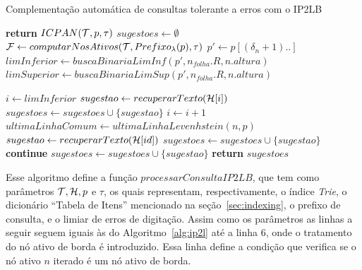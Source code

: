 \begin{algorithm}[H]
\caption{Complementação automática de consultas tolerante a erros com o IP2LB}\label{alg:ip2lb}
\begin{algorithmic}[1]
     \textbf{return} $ICPAN(\mathcal{T},p,\tau)$
    \EndIf
    \State $sugestoes \leftarrow \emptyset$
    \State $\mathcal{F} \leftarrow computarNosAtivos(\mathcal{T}, Prefixo_{\lambda}(p), \tau)$ 
         
         
                \State $p' \gets p[(\delta_{n} + 1)..]$
                \State $limInferior \gets buscaBinariaLimInf(p', n_{folha}.R, n.altura)$
                \State $limSuperior \gets buscaBinariaLimSup(p', n_{folha}.R, n.altura)$
                
                    \State $i \gets limInferior$
                        \State $sugestao \leftarrow recuperarTexto(\mathcal{H}[i])$
                        \State $sugestoes \gets sugestoes \cup \{ sugestao \} $
                        \State $i \gets i + 1$
                    \EndWhile
                \EndIf
            \EndFor
        \Else {}
            \State $ultimaLinhaComum \leftarrow ultimaLinhaLevenhstein(n, p)$
                    \State $sugestao \leftarrow recuperarTexto(\mathcal{H}[id])$
                        \State $sugestoes \leftarrow sugestoes \cup \{ sugestao \}$
                        \State \textbf{continue}
                    \EndIf
                        \State $sugestoes \leftarrow sugestoes \cup \{ sugestao \}$
                    \EndIf
                \EndFor
            \EndFor
        \EndIf
    \EndFor
    \State \textbf{return} $sugestoes$
\EndFunction
\end{algorithmic}
\end{algorithm}

Esse algoritmo define a função $processarConsultaIP2LB$, que tem como parâmetros $\mathcal{T}, \mathcal{H}, p$ e $\tau$, os quais representam, respectivamente, o índice \textit{Trie}, o dicionário ``Tabela de Itens'' mencionado na seção~\ref{sec:indexing}, o prefixo de consulta, e o limiar de erros de digitação. Assim como os parâmetros as linhas a seguir seguem iguais às do Algoritmo~\ref{alg:ip2l} até a linha 6, onde o tratamento do nó ativo de borda é introduzido. Essa linha define a condição que verifica se o nó ativo $n$ iterado é um nó ativo de borda.

